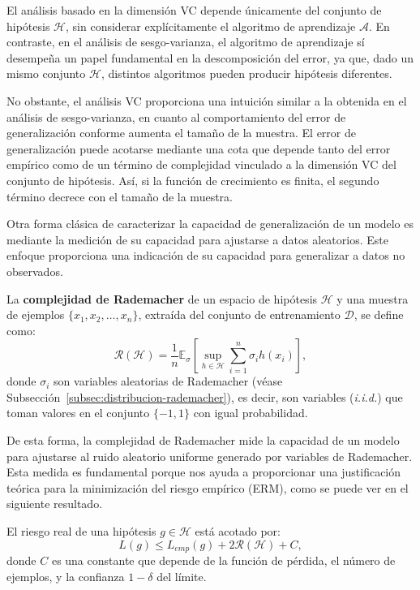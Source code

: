 \begin{observacion}
    El análisis basado en la dimensión VC depende únicamente del conjunto de hipótesis $\mathcal{H}$, sin considerar explícitamente el algoritmo de aprendizaje $\mathcal{A}$. En contraste, en el análisis de sesgo-varianza, el algoritmo de aprendizaje sí desempeña un papel fundamental en la descomposición del error, ya que, dado un mismo conjunto $\mathcal{H}$, distintos algoritmos pueden producir hipótesis diferentes.
\end{observacion}

No obstante, el análisis VC proporciona una intuición similar a la obtenida en el análisis de sesgo-varianza, en cuanto al comportamiento del error de generalización conforme aumenta el tamaño de la muestra. El error de generalización puede acotarse mediante una cota que depende tanto del error empírico como de un término de complejidad vinculado a la dimensión VC del conjunto de hipótesis. Así, si la función de crecimiento es finita, el segundo término decrece con el tamaño de la muestra.

Otra forma clásica de caracterizar la capacidad de generalización de un modelo es mediante la medición de su capacidad para ajustarse a datos aleatorios. Este enfoque proporciona una indicación de su capacidad para generalizar a datos no observados.

\begin{definicion}
    La \textbf{complejidad de Rademacher} de un espacio de hipótesis $ \mathcal{H} $ y una muestra de ejemplos $\{ x_1, x_2, \dots, x_n \}$, extraída del conjunto de entrenamiento $ \mathcal{D} $, se define como:
    \[
        \mathcal{R}(\mathcal{H}) = \frac{1}{n} \mathbb{E}_{\sigma} \left[ \sup_{h \in \mathcal{H}} \sum_{i=1}^n \sigma_i h(x_i) \right],
    \]
    donde $ \sigma_i $ son variables aleatorias de Rademacher (véase Subsección~\ref{subsec:distribucion-rademacher}), es decir, son variables (\textit{i.i.d.}) que toman valores en el conjunto $ \{-1, 1\} $ con igual probabilidad.
\end{definicion}

De esta forma, la complejidad de Rademacher mide la capacidad de un modelo para ajustarse al ruido aleatorio uniforme generado por variables de Rademacher. Esta medida es fundamental porque nos ayuda a proporcionar una justificación teórica para la minimización del riesgo empírico (ERM), como se puede ver en el siguiente resultado.

\begin{teorema}
    El riesgo real de una hipótesis $ g \in \mathcal{H} $ está acotado por:
    \[
        L(g) \leq L_{emp}(g) + 2 \mathcal{R}(\mathcal{H}) + C,
    \]
    donde $ C $ es una constante que depende de la función de pérdida, el número de ejemplos, y la confianza $ 1 - \delta $ del límite.
\end{teorema}

